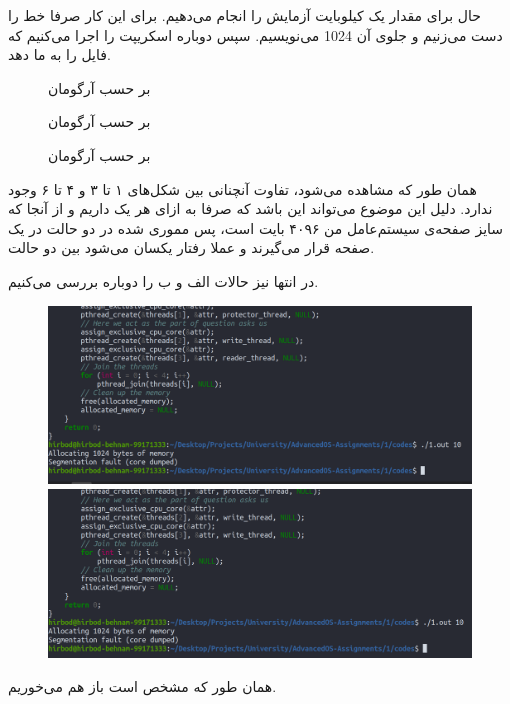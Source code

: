 حال برای مقدار یک کیلوبایت آزمایش را انجام می‌دهیم. برای این کار صرفا خط
را دست می‌زنیم و جلوی آن
1024
می‌نویسیم. سپس دوباره اسکریپت را اجرا می‌کنیم که فایل
را به ما دهد.
\begin{figure}[H]
    \centering
    \caption{ بر حسب آرگومان}
\end{figure}
\begin{figure}[H]
    \centering
    \caption{ بر حسب آرگومان}
\end{figure}
\begin{figure}[H]
    \centering
    \caption{ بر حسب آرگومان}
\end{figure}
همان طور که مشاهده می‌شود،‌ تفاوت آنچنانی بین شکل‌های ۱ تا ۳ و ۴ تا ۶ وجود ندارد.
دلیل این موضوع می‌تواند این باشد که صرفا به ازای هر
یک
داریم و از آنجا که سایز صفحه‌ی سیستم‌عامل من
۴۰۹۶ بایت است، پس مموری
شده در دو حالت در یک صفحه قرار می‌گیرند و عملا رفتار
یکسان می‌شود بین دو حالت.

در انتها نیز حالات
الف و ب را دوباره بررسی می‌کنیم.
\begin{figure}[H]
    \centering
    \includegraphics[scale=0.3]{pics/segfault3.png}
    \includegraphics[scale=0.3]{pics/segfault4.png}
\end{figure}
همان طور که مشخص است باز هم
می‌خوریم.
